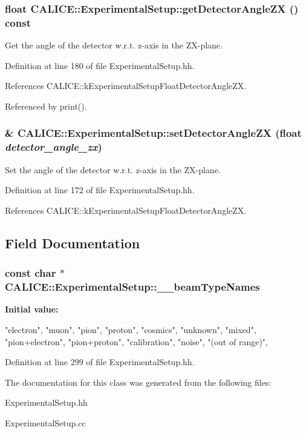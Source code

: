 \subsubsection[{getDetectorAngleZX}]{\setlength{\rightskip}{0pt plus 5cm}float CALICE::ExperimentalSetup::getDetectorAngleZX () const\hspace{0.3cm}{\ttfamily  [inline]}}\label{classCALICE_1_1ExperimentalSetup_a5b8502ad820a72a192e5eb71c82898ab}


Get the angle of the detector w.r.t. z-\/axis in the ZX-\/plane. 

Definition at line 180 of file ExperimentalSetup.hh.

References CALICE::kExperimentalSetupFloatDetectorAngleZX.

Referenced by print().
\subsubsection[{setDetectorAngleZX}]{\& CALICE::ExperimentalSetup::setDetectorAngleZX (float {\em detector\_\-angle\_\-zx})\hspace{0.3cm}{\ttfamily  [inline]}}\label{classCALICE_1_1ExperimentalSetup_abbb90a6beb24b835bddffa9eb774bf8d}


Set the angle of the detector w.r.t. z-\/axis in the ZX-\/plane. 

Definition at line 172 of file ExperimentalSetup.hh.

References CALICE::kExperimentalSetupFloatDetectorAngleZX.

\subsection{Field Documentation}
\subsubsection[{\_\-\_\-beamTypeNames}]{\setlength{\rightskip}{0pt plus 5cm}const char $\ast$ CALICE::ExperimentalSetup::\_\-\_\-beamTypeNames\hspace{0.3cm}{\ttfamily  [static]}}\label{classCALICE_1_1ExperimentalSetup_aeefc3ac2b27cb5189f3ef0cca488c36e}
{\bfseries Initial value:}
\begin{DoxyCode}
{
    "electron",
    "muon",
    "pion",
    "proton",
    "cosmics",
    "unknown",
    "mixed", 
    "pion+electron",
    "pion+proton",
    "calibration",
    "noise",
    "(out of range)",
  }
\end{DoxyCode}


Definition at line 299 of file ExperimentalSetup.hh.

The documentation for this class was generated from the following files:\begin{DoxyCompactItemize}
\item 
ExperimentalSetup.hh\item 
ExperimentalSetup.cc\end{DoxyCompactItemize}
